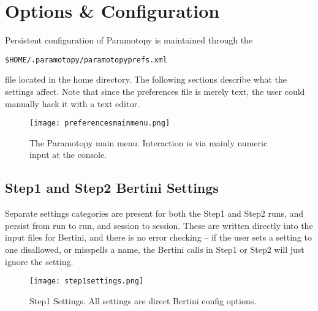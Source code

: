 \clearpage
\section{Options \& Configuration}
\label{sec:options}

Persistent configuration of Paramotopy is maintained through the {\begin{center}\texttt{\$HOME/.paramotopy/paramotopyprefs.xml} \end{center}} \noindent file located in the home directory.  The following sections describe what the settings affect.  Note that since the preferences file is merely text, the user could manually hack it with a text editor.


\begin{figure}[h]
\begin{center}
\texttt{[image: preferencesmainmenu.png]}
\caption[Preferences Main Menu]{The Paramotopy main menu.  Interaction is via mainly numeric input at the console.}
\label{screen:prefsmainmenu}
\end{center}
\end{figure}


\subsection{Step1 and Step2 Bertini Settings}

Separate settings categories are present for both the Step1 and Step2 runs, and persist from run to run, and session to session.  These are written directly into the input files for Bertini, and there is no error checking -- if the user sets a setting to one disallowed, or misspells a name, the Bertini calls in Step1 or Step2 will just ignore the setting.

\begin{figure}[h]
\begin{center}
\texttt{[image: step1settings.png]}
\caption[Step 1 Settings]{Step1 Settings.  All settings are direct Bertini config options.}
\label{screen:step1menu}
\end{center}
\end{figure}


